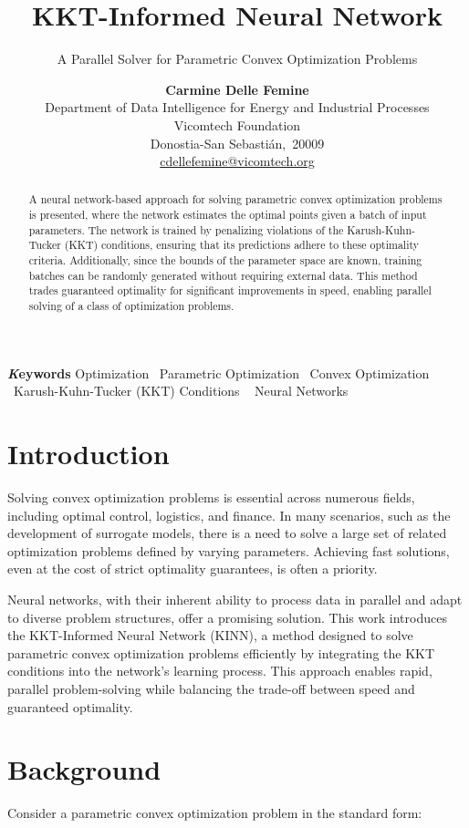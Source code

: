 \documentclass[
]{article}
\title{KKT-Informed Neural Network}
\subtitle{A Parallel Solver for Parametric Convex Optimization Problems}
\author{\textbf{Carmine Delle Femine}\\Department of Data Intelligence
for Energy and Industrial Processes\\Vicomtech Foundation\\Donostia-San
Sebastián,\ 20009\\\href{mailto:cdellefemine@vicomtech.org}{cdellefemine@vicomtech.org}}
\date{}
\begin{document}
\maketitle
\begin{abstract}
A neural network-based approach for solving parametric convex
optimization problems is presented, where the network estimates the
optimal points given a batch of input parameters. The network is trained
by penalizing violations of the Karush-Kuhn-Tucker (KKT) conditions,
ensuring that its predictions adhere to these optimality criteria.
Additionally, since the bounds of the parameter space are known,
training batches can be randomly generated without requiring external
data. This method trades guaranteed optimality for significant
improvements in speed, enabling parallel solving of a class of
optimization problems.
\end{abstract}
{\bfseries \emph Keywords}
\def\sep{\textbullet\ }
Optimization \sep Parametric Optimization \sep Convex
Optimization \sep Karush-Kuhn-Tucker (KKT) Conditions \sep 
Neural Networks


\section{Introduction}\label{introduction}

Solving convex optimization problems is essential across numerous
fields, including optimal control, logistics, and finance. In many
scenarios, such as the development of surrogate models, there is a need
to solve a large set of related optimization problems defined by varying
parameters. Achieving fast solutions, even at the cost of strict
optimality guarantees, is often a priority.

Neural networks, with their inherent ability to process data in parallel
and adapt to diverse problem structures, offer a promising solution.
This work introduces the KKT-Informed Neural Network (KINN), a method
designed to solve parametric convex optimization problems efficiently by
integrating the KKT conditions into the network's learning process. This
approach enables rapid, parallel problem-solving while balancing the
trade-off between speed and guaranteed optimality.

\section{Background}\label{background}

Consider a parametric convex optimization problem in the standard form:
\end{document}
